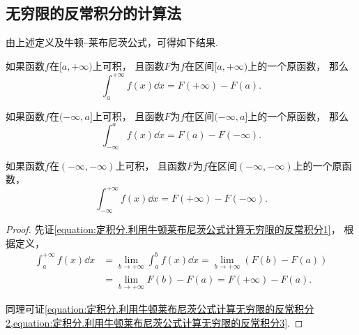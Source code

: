 \subsection{无穷限的反常积分的计算法}
由上述定义及牛顿--莱布尼茨公式，可得如下结果.
\begin{theorem}\label{theorem:定积分.利用牛顿莱布尼茨公式计算无穷限的反常积分}
如果函数\(f\)在\([a,+\infty)\)上可积，
且函数\(F\)为\(f\)在区间\([a,+\infty)\)上的一个原函数，
那么\begin{equation}\label{equation:定积分.利用牛顿莱布尼茨公式计算无穷限的反常积分1}
	\int_a^{+\infty} f(x) \dd{x}
	= F(+\infty) - F(a).
\end{equation}

如果函数\(f\)在\((-\infty,a]\)上可积，
且函数\(F\)为\(f\)在区间\((-\infty,a]\)上的一个原函数，
那么\begin{equation}\label{equation:定积分.利用牛顿莱布尼茨公式计算无穷限的反常积分2}
	\int_{-\infty}^a f(x) \dd{x}
	= F(a) - F(-\infty).
\end{equation}

如果函数\(f\)在\((-\infty,-\infty)\)上可积，
且函数\(F\)为\(f\)在区间\((-\infty,-\infty)\)上的一个原函数，
\begin{equation}\label{equation:定积分.利用牛顿莱布尼茨公式计算无穷限的反常积分3}
	\int_{-\infty}^{+\infty} f(x) \dd{x}
	= F(+\infty) - F(-\infty).
\end{equation}
\begin{proof}
先证\cref{equation:定积分.利用牛顿莱布尼茨公式计算无穷限的反常积分1}，
根据定义，\begin{align*}
	\int_a^{+\infty} f(x) \dd{x}
	&= \lim_{b\to+\infty} \int_a^b f(x) \dd{x}
	= \lim_{b\to+\infty} (F(b) - F(a)) \\
	&= \lim_{b\to+\infty} F(b) - F(a)
	= F(+\infty) - F(a).
\end{align*}

同理可证\cref{equation:定积分.利用牛顿莱布尼茨公式计算无穷限的反常积分2,equation:定积分.利用牛顿莱布尼茨公式计算无穷限的反常积分3}.
\end{proof}
\end{theorem}

